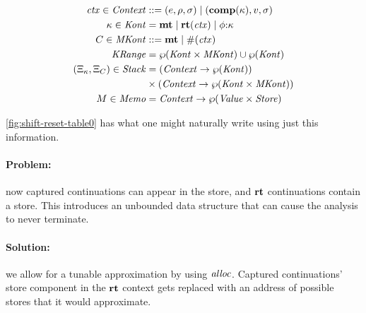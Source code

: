 \begin{align*}
  \mathit{ctx} \in \mathit{Context} &::= (e,\rho,\sigma) \mathrel{\mid} (\mathbf{comp}(\kappa),v,\sigma) \\
  \kappa \in \mathit{Kont} &= \mathbf{mt} \mathrel{\mid} \mathbf{rt}(\mathit{ctx}) \mathrel{\mid} \phi{\tt :} \kappa \\
  C \in \mathit{MKont} &::= \mathbf{mt} \mathrel{\mid} \#(\mathit{ctx}) \\
  \mathit{KRange} &= \wp(\mathit{Kont} \times \mathit{MKont}) \cup \wp(\mathit{Kont}) \\
  (\Xi_\kappa,\Xi_C) \in \mathit{Stack} &= (\mathit{Context} \to \wp(\mathit{Kont})) \\
                                        &\times (\mathit{Context} \to \wp(\mathit{Kont} \times \mathit{MKont})) \\
  M \in \mathit{Memo} &= \mathit{Context} \to \wp(\mathit{Value} \times \mathit{Store})
\end{align*}

\autoref{fig:shift-reset-table0} has what one might naturally write using just this information.
%
\paragraph{Problem:} now captured continuations can appear in the store, and $\mathbf{rt}$ continuations contain a store.
%
This introduces an unbounded data structure that can cause the analysis to never terminate.

\paragraph{Solution:} we allow for a tunable approximation by using $\mathit{alloc}$.
%
Captured continuations' store component in the $\mathbf{rt}$ context gets replaced with an address of possible stores that it would approximate.

